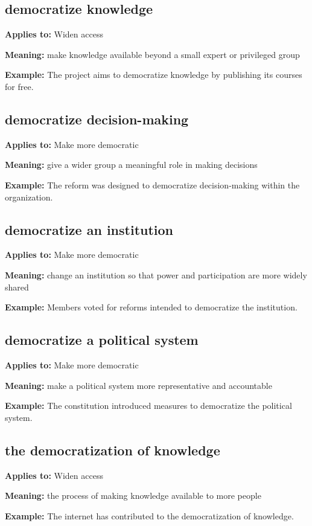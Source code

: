 \documentclass[11pt]{article}
\begin{document}
\subsection{democratize knowledge}
\textbf{Applies to:} Widen access

\textbf{Meaning:} make knowledge available beyond a small expert or privileged group

\textbf{Example:} The project aims to democratize knowledge by publishing its courses for free.

\subsection{democratize decision-making}
\textbf{Applies to:} Make more democratic

\textbf{Meaning:} give a wider group a meaningful role in making decisions

\textbf{Example:} The reform was designed to democratize decision-making within the organization.

\subsection{democratize an institution}
\textbf{Applies to:} Make more democratic

\textbf{Meaning:} change an institution so that power and participation are more widely shared

\textbf{Example:} Members voted for reforms intended to democratize the institution.

\subsection{democratize a political system}
\textbf{Applies to:} Make more democratic

\textbf{Meaning:} make a political system more representative and accountable

\textbf{Example:} The constitution introduced measures to democratize the political system.

\subsection{the democratization of knowledge}
\textbf{Applies to:} Widen access

\textbf{Meaning:} the process of making knowledge available to more people

\textbf{Example:} The internet has contributed to the democratization of knowledge.
\end{document}
